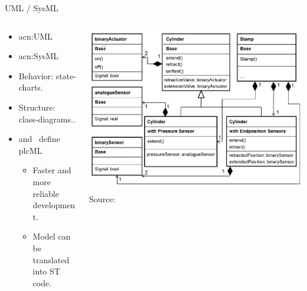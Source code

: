 \documentclass[18pt]{beamer}
\begin{document}
\begin{frame}{UML / SysML}
\begin{columns}
    \begin{column}{0.6\textwidth}
        \begin{itemize}
            \item \acrfull{acn:UML}
            \item  \acrfull{acn:SysML}
            \item Behavior: state-charts.
            \item Structure: class-diagrams..
            \item \cite{WITSCH2015} and~\cite{VH:2014} define plcML
            \begin{itemize}
                \item Faster and more reliable development.
                \item Model can be translated into ST code.
            \end{itemize}
        \end{itemize}
    \end{column}
    \begin{column}{0.4\textwidth}
        \includegraphics[width=\textwidth]{./figures/modAT4rMS_struct.png}
        {\footnotesize  Source:~\cite{VH:2014}}
    \end{column}
\end{columns}

\end{frame}

\backupend
\end{document}
